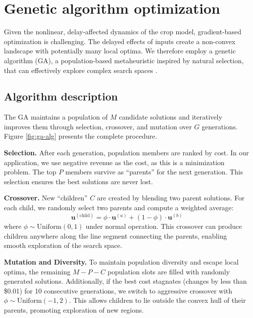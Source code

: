 \documentclass[pdflatex,sn-mathphys-num]{sn-jnl}
\begin{document}
\section{Genetic algorithm optimization}\label{sec:ga}

Given the nonlinear, delay-affected dynamics of the crop model, gradient-based optimization is challenging. The delayed effects of inputs create a non-convex landscape with potentially many local optima. We therefore employ a genetic algorithm (GA), a population-based metaheuristic inspired by natural selection, that can effectively explore complex search spaces \cite{goldberg1989ga}.

\subsection{Algorithm description}\label{subsec:ga-alg}

The GA maintains a population of $M$ candidate solutions and iteratively improves them through selection, crossover, and mutation over $G$ generations. Figure \ref{fig:ga-alg} presents the complete procedure.

\textbf{Selection.} After each generation, population members are ranked by cost. In our application, we use negative revenue as the cost, as this is a minimization problem. The top $P$ members survive as ``parents'' for the next generation. This selection ensures the best solutions are never lost.

\textbf{Crossover.} New ``children'' $C$ are created by blending two parent solutions. For each child, we randomly select two parents and compute a weighted average:
\begin{equation}
\mathbf{u}^{(\text{child})} = \phi \cdot \mathbf{u}^{(a)} + (1 - \phi) \cdot \mathbf{u}^{(b)}
\label{eqn:crossover}
\end{equation}
where $\phi \sim \text{Uniform}(0, 1)$ under normal operation. This crossover can produce children anywhere along the line segment connecting the parents, enabling smooth exploration of the search space.

\textbf{Mutation and Diversity.} To maintain population diversity and escape local optima, the remaining $M - P - C$ population slots are filled with randomly generated solutions. Additionally, if the best cost stagnates (changes by less than \$0.01) for 10 consecutive generations, we switch to aggressive crossover with $\phi \sim \text{Uniform}(-1, 2)$. This allows children to lie outside the convex hull of their parents, promoting exploration of new regions.
\end{document}

